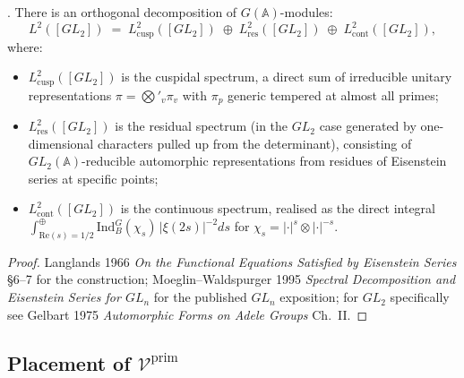 \begin{theorem}
\label{v4-arith:kms-gns:thm:spectral-decomposition}
\ClaimStatusProvedElsewhere. There is an orthogonal decomposition of
\(G(\mathbb{A})\)-modules:
\begin{equation}
\label{v4-arith:kms-gns:eq:L2-decomposition}
L^{2}([GL_{2}])\;=\;L^{2}_{\mathrm{cusp}}([GL_{2}])\;\oplus\;L^{2}_{\mathrm{res}}([GL_{2}])\;\oplus\;L^{2}_{\mathrm{cont}}([GL_{2}]),
\end{equation}
where:
\begin{itemize}
\item \(L^{2}_{\mathrm{cusp}}([GL_{2}])\) is the cuspidal spectrum,
a direct sum of irreducible unitary representations
\(\pi=\bigotimes'_{v}\pi_{v}\) with \(\pi_{p}\) generic tempered at
almost all primes;
\item \(L^{2}_{\mathrm{res}}([GL_{2}])\) is the residual spectrum
(in the \(GL_{2}\) case generated by one-dimensional characters
pulled up from the determinant), consisting of \(GL_{2}(\mathbb{A})\)-reducible
automorphic representations from residues of Eisenstein series at
specific points;
\item \(L^{2}_{\mathrm{cont}}([GL_{2}])\) is the continuous spectrum,
realised as the direct integral
\(\int^{\oplus}_{\mathrm{Re}(s)=1/2}\mathrm{Ind}_{B}^{G}(\chi_{s})\,|\xi(2s)|^{-2}ds\)
for \(\chi_{s}=|\cdot|^{s}\otimes|\cdot|^{-s}\).
\end{itemize}
\end{theorem}

\begin{proof}
Langlands 1966 \emph{On the Functional Equations Satisfied by
Eisenstein Series} \S6--7 for the construction; Moeglin--Waldspurger
1995 \emph{Spectral Decomposition and Eisenstein Series for \(GL_{n}\)}
for the published \(GL_{n}\) exposition; for \(GL_{2}\) specifically see
Gelbart 1975 \emph{Automorphic Forms on Adele Groups} Ch.~II.
\end{proof}

\subsection{Placement of \(\mathcal{V}^{\mathrm{prim}}\)}
\label{v4-arith:kms-gns:cycle3:placement}

